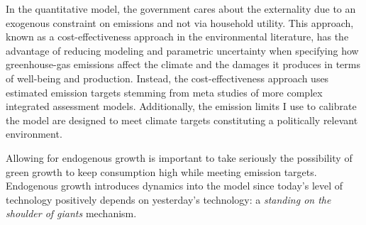 In the quantitative model, the government cares about the externality due to an exogenous constraint on emissions and not via household utility. This approach, known as a cost-effectiveness approach in the environmental literature, has the advantage of reducing modeling and parametric uncertainty when specifying how greenhouse-gas emissions affect the climate and the damages it produces in terms of well-being and production. Instead, the cost-effectiveness approach uses estimated emission targets stemming from meta studies of more complex integrated assessment models. Additionally, the emission limits I use to calibrate the model are designed to meet climate targets constituting a politically relevant environment. 

Allowing for endogenous growth is important to take seriously the possibility of green growth to keep consumption high while meeting emission targets. Endogenous growth introduces dynamics into the model since today's level of technology positively depends on yesterday's technology: a \textit{standing on the shoulder of giants} mechanism.  




